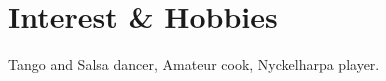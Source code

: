 \ifhobbies
\section{Interest \& Hobbies}
Tango and Salsa dancer, Amateur cook, Nyckelharpa player.
\fi


%
%

